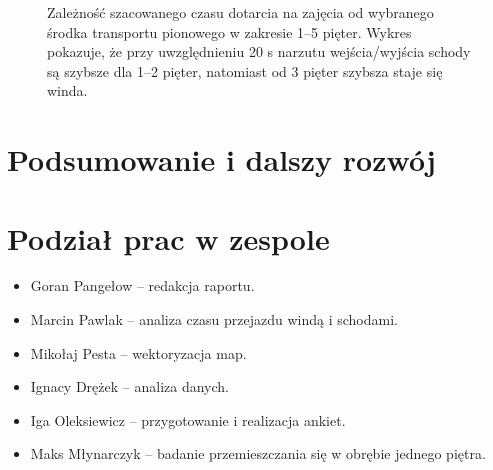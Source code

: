 \documentclass[14pt,a4paper]{extarticle}
\begin{document}
\begin{figure}[H]
    \centering
    \caption{Zależność szacowanego czasu dotarcia na zajęcia od wybranego środka transportu pionowego w zakresie 1--5 pięter. Wykres pokazuje, że przy uwzględnieniu 20 s narzutu wejścia/wyjścia schody są szybsze dla 1--2 pięter, natomiast od 3 pięter szybsza staje się winda.}
    \label{fig:wykres-windy}
\end{figure}

\section{Podsumowanie i dalszy rozwój}

\section{Podział prac w zespole}

\begin{itemize}
    \item Goran Pangełow -- redakcja raportu.
    \item Marcin Pawlak -- analiza czasu przejazdu windą i schodami.
    \item Mikołaj Pesta -- wektoryzacja map.
    \item Ignacy Drężek -- analiza danych.
    \item Iga Oleksiewicz -- przygotowanie i realizacja ankiet.
    \item Maks Młynarczyk -- badanie przemieszczania się w obrębie jednego piętra.
\end{itemize}
\end{document}
